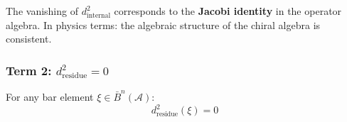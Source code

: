 \begin{remark}
The vanishing of $d_{\text{internal}}^2$ corresponds to the \textbf{Jacobi identity}
in the operator algebra. In physics terms: the algebraic structure of the chiral
algebra is consistent.
\end{remark}

\subsubsection{Term 2: $d_{\text{residue}}^2 = 0$}

\begin{proposition}\label{prop:d-res-squared}
For any bar element $\xi \in \bar{B}^n(\mathcal{A})$:
$$d_{\text{residue}}^2(\xi) = 0$$
\end{proposition}

